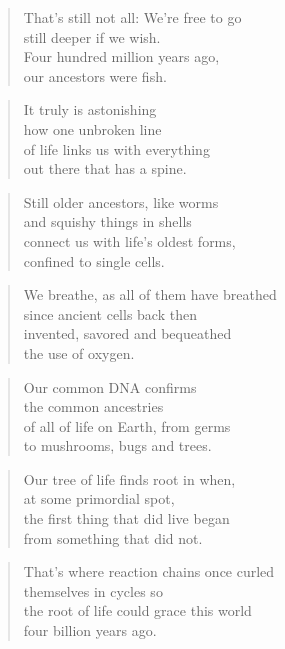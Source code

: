 \documentclass[10pt,a4paper]{article}
\begin{document}
\begin{paracol}{2}
\begin{verse}
That’s still not all: We’re free to go\\
still deeper if we wish.\\
Four hundred million years ago,\\
our ancestors were fish.
\end{verse}

\begin{verse}
It truly is astonishing\\
how one unbroken line\\
of life links us with everything\\
out there that has a spine.
\end{verse}

\begin{verse}
Still older ancestors, like worms\\
and squishy things in shells\\
connect us with life’s oldest forms,\\
confined to single cells.
\end{verse}

\begin{verse}
We breathe, as all of them have breathed\\
since ancient cells back then\\
invented, savored and bequeathed\\
the use of oxygen.
\end{verse}

\begin{verse}
Our common DNA confirms\\
the common ancestries\\
of all of life on Earth, from germs\\
to mushrooms, bugs and trees.
\end{verse}

\begin{verse}
Our tree of life finds root in when,\\
at some primordial spot,\\
the first thing that did live began\\
from something that did not.
\end{verse}

\begin{verse}
That’s where reaction chains once curled\\
themselves in cycles so\\
the root of life could grace this world\\
four billion years ago.
\end{verse}


\end{paracol}
\end{document}

